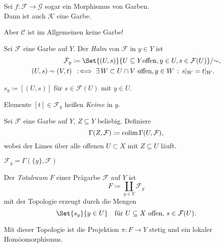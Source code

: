 \documentclass{cheat-sheet}
\newcommand{\Fais}{\mathcal{F}} %
\newcommand{\Garb}{\mathcal{G}} %
\begin{document}
\begin{prop}
  Sei $f : \Fais \to \Garb$ sogar ein Morphismus von Garben. \\
  Dann ist auch $\mathcal{K}$ eine Garbe.
\end{prop}

\begin{acht}
  Aber $\mathcal{C}$ ist im Allgemeinen keine Garbe!
\end{acht}


\begin{defn}
  Sei $\Fais$ eine Garbe auf $Y$. Der \emph{Halm} von $\Fais$ in $y \in Y$ ist
  \begin{align*}
    \Fais_y & \coloneqq \Set{(U, s)}{U \subseteq Y \text{offen}, y \in U, s \in \Fais(U)} / {\sim}, \\
    (U, s) \sim (V, t) & \coloniff \ex{W \subset U \cap V \text{ offen}, y \in W} s|_W = t|_W.
  \end{align*}
\end{defn}

\begin{nota}
  $s_y \coloneqq [(U, s)]$ für $s \in \Fais(U)$ mit $y \in U$.
\end{nota}

\begin{sprech}
  Elemente $[t] \in \Fais_y$ heißen \emph{Keime} in $y$.
\end{sprech}

\begin{defn}
  Sei $\Fais$ eine Garbe auf $Y$, $Z \subseteq Y$ beliebig. Definiere
  \[ \Gamma(Z, \Fais) \coloneqq \Colim \Gamma(U, \Fais), \]
  wobei der Limes über alle offenen $U \subset X$ mit $Z \subseteq U$ läuft.
\end{defn}

\begin{beob}
  $\Fais_y = \Gamma(\{y\}, \Fais)$
\end{beob}

\begin{defn}
  Der \emph{Totalraum} $F$ einer Prägarbe $\Fais$ auf $Y$ ist
  \[ F \coloneqq \coprod_{y \in Y} \Fais_y \]
  mit der Topologie erzeugt durch die Mengen
  \[
    \Set{s_y}{ y \in U } \quad
    \text{für $U \subseteq X$ offen, $s \in \Fais(U)$.}
  \]
\end{defn}

\begin{bem}
  Mit dieser Topologie ist die Projektion $\pi : F \to Y$ stetig und ein lokaler Homöomorphismus.
\end{bem}
\end{document}
